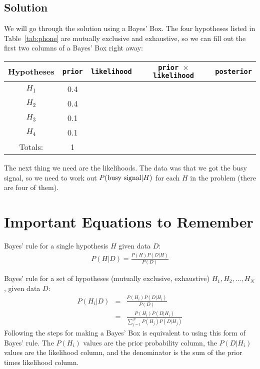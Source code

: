 \subsection{Solution}
We will go through the solution using a Bayes' Box. The four hypotheses listed
in Table~\ref{tab:phone} are mutually exclusive and exhaustive, so we can fill
out the first two columns of a Bayes' Box right away:
\begin{table}[h!]
\begin{center}
\begin{tabular}{|c|c|c|c|c|}
\hline
{\bf Hypotheses} & {\tt prior} & {\tt likelihood} &
{\tt prior $\times$ likelihood} & {\tt posterior}\\
\hline
$H_1$ & 0.4 &  &  & \\
$H_2$ & 0.4 &  &  & \\
$H_3$ & 0.1 &  &  & \\
$H_4$ & 0.1 &  &  & \\
\hline
Totals: & 1 & & & \\
\hline
\end{tabular}
\end{center}
\end{table}
The next thing we need are the likelihoods. The data was that we got the busy
signal, so we need to work out $P(\textnormal{busy signal} | H)$ for each $H$
in the problem (there are four of them).



\section{Important Equations to Remember}
Bayes' rule for a single hypothesis $H$ given data $D$:
\begin{eqnarray}
P(H|D) = \frac{P(H)P(D|H)}{P(D)}
\end{eqnarray}

Bayes' rule for a set of hypotheses (mutually exclusive, exhaustive)
$H_1, H_2, ..., H_N$, given data $D$:
\begin{eqnarray}
P(H_i|D) &=& \frac{P(H_i)P(D|H_i)}{P(D)} \\
&=& \frac{P(H_i)P(D|H_i)}{\sum_{j=1}^N P(H_j)P(D|H_j)}
\end{eqnarray}
Following the steps for making a Bayes' Box is equivalent to using this form
of Bayes' rule. The $P(H_i)$ values are the prior probability column, the
$P(D|H_i)$ values are the likelihood column, and the denominator is the
sum of the prior times likelihood column.

